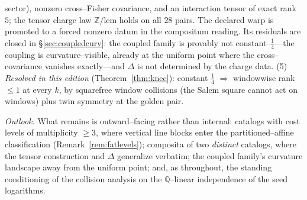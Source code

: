 \documentclass[11pt]{article}
\theoremstyle{definition}
\newcommand{\Q}{\mathbb{Q}}
\newcommand{\Z}{\mathbb{Z}}
\begin{document}
sector), nonzero cross--Fisher covariance, and an interaction tensor of exact rank $5$; the
tensor charge law $\Z/\mathrm{lcm}$ holds on all $28$ pairs. The declared warp is promoted to a
forced nonzero datum in the compositum reading. Its residuals are closed in
\S\ref{sec:coupledcurv}: the coupled family is provably not constant--$\tfrac14$---the coupling
is curvature--visible, already at the uniform point where the cross--covariance vanishes
exactly---and $\Delta$ is not determined by the charge data.
(5) \emph{Resolved in this edition} (Theorem~\ref{thm:knec}): constant $\tfrac14$
$\Rightarrow$ windowwise rank $\le1$ at every $k$, by squarefree window collisions (the Salem
square cannot act on windows) plus twin symmetry at the golden pair.

\medskip
\noindent\emph{Outlook.} What remains is outward--facing rather than internal: catalogs with
cost levels of multiplicity $\ge3$, where vertical line blocks enter the partitioned--affine
classification (Remark~\ref{rem:fatlevels}); composita of two \emph{distinct} catalogs, where
the tensor construction and $\Delta$ generalize verbatim; the coupled family's curvature
landscape away from the uniform point; and, as throughout, the standing conditioning of the
collision analysis on the $\Q$--linear independence of the seed logarithms.

\appendix
\end{document}
